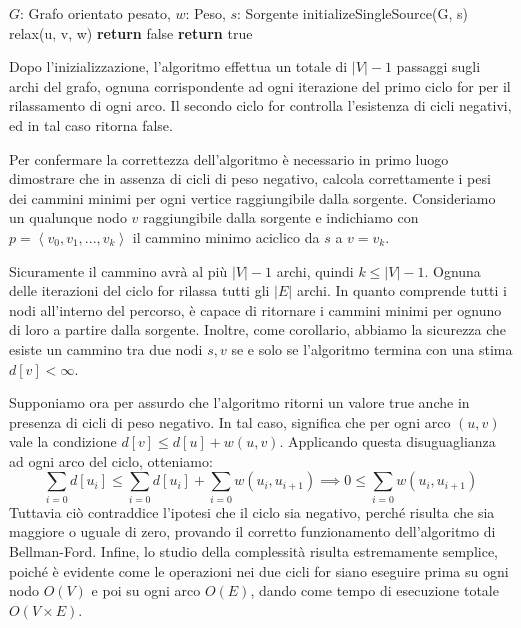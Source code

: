 \begin{algorithm}[h]
	\caption{bellman-ford(G, w, s)}
	\begin{algorithmic}[i]
		\Require $G$: Grafo orientato pesato, $w$: Peso, $s$: Sorgente
		\State initializeSingleSource(G, s)
		\State relax(u, v, w)
		\EndFor
		\EndFor
		\State
		 
		 
		\State \textbf{return} false
		\EndIf
		\EndFor
		\State \textbf{return} true
	\end{algorithmic}
\end{algorithm}

\noindent Dopo l'inizializzazione, l'algoritmo effettua un totale di $|V|-1$ passaggi sugli archi del grafo, ognuna corrispondente ad ogni iterazione
del primo ciclo for per il rilassamento di ogni arco. Il secondo ciclo for controlla l'esistenza di cicli negativi, ed in tal caso ritorna false.\par
Per confermare la correttezza dell'algoritmo è necessario in primo luogo dimostrare che in assenza di cicli di peso negativo, calcola correttamente i
pesi dei cammini minimi per ogni vertice raggiungibile dalla sorgente. Consideriamo un qualunque nodo $v$ raggiungibile dalla sorgente e indichiamo con
$p = \left<v_0, v_1, ..., v_k \right>$ il cammino minimo aciclico da $s$ a $v=v_k$.\par
Sicuramente il cammino avrà al più $|V|-1$ archi, quindi $k \leq |V|-1$. Ognuna delle iterazioni del ciclo for rilassa tutti gli $|E|$ archi. In quanto
comprende tutti i nodi all'interno del percorso, è capace di ritornare i cammini minimi per ognuno di loro a partire dalla sorgente. Inoltre, come
corollario, abbiamo la sicurezza che esiste un cammino tra due nodi $s, v$ se e solo se l'algoritmo termina con una stima $d[v] < \infty$.\newline

\noindent Supponiamo ora per assurdo che l'algoritmo ritorni un valore true anche in presenza di cicli di peso negativo. In tal caso, significa che per
ogni arco $(u,v)$ vale la condizione $d[v] \leq d[u] + w(u,v)$. Applicando questa disuguaglianza ad ogni arco del ciclo, otteniamo: \[
	\sum_{i=0} d[u_i] \leq \sum_{i=0} d[u_i] + \sum_{i=0} w(u_i, u_{i+1}) \implies 0 \leq \sum_{i=0} w(u_i, u_{i+1})
\]
\noindent Tuttavia ciò contraddice l'ipotesi che il ciclo sia negativo, perché risulta che sia maggiore o uguale di zero, provando il corretto
funzionamento dell'algoritmo di Bellman-Ford. Infine, lo studio della complessità risulta estremamente semplice, poiché è evidente come le operazioni
nei due cicli for siano eseguire prima su ogni nodo $O(V)$ e poi su ogni arco $O(E)$, dando come tempo di esecuzione totale $O(V\times E)$.\newline

